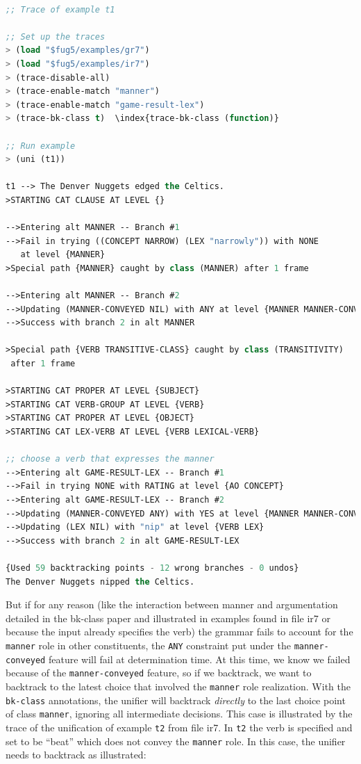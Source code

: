 \documentclass[10pt,a4paper]{report}
\begin{document}
\begin{lstlisting}[language=Lisp]

;; Trace of example t1

;; Set up the traces
> (load "$fug5/examples/gr7")
> (load "$fug5/examples/ir7")
> (trace-disable-all)
> (trace-enable-match "manner")
> (trace-enable-match "game-result-lex")
> (trace-bk-class t)  \index{trace-bk-class (function)}

;; Run example
> (uni (t1))

t1 --> The Denver Nuggets edged the Celtics.
>STARTING CAT CLAUSE AT LEVEL {}

-->Entering alt MANNER -- Branch #1
-->Fail in trying ((CONCEPT NARROW) (LEX "narrowly")) with NONE 
   at level {MANNER}
>Special path {MANNER} caught by class (MANNER) after 1 frame

-->Entering alt MANNER -- Branch #2
-->Updating (MANNER-CONVEYED NIL) with ANY at level {MANNER MANNER-CONVEYED}
-->Success with branch 2 in alt MANNER

>Special path {VERB TRANSITIVE-CLASS} caught by class (TRANSITIVITY) 
 after 1 frame

>STARTING CAT PROPER AT LEVEL {SUBJECT}
>STARTING CAT VERB-GROUP AT LEVEL {VERB}
>STARTING CAT PROPER AT LEVEL {OBJECT}
>STARTING CAT LEX-VERB AT LEVEL {VERB LEXICAL-VERB}

;; choose a verb that expresses the manner
-->Entering alt GAME-RESULT-LEX -- Branch #1
-->Fail in trying NONE with RATING at level {AO CONCEPT}
-->Entering alt GAME-RESULT-LEX -- Branch #2
-->Updating (MANNER-CONVEYED ANY) with YES at level {MANNER MANNER-CONVEYED}
-->Updating (LEX NIL) with "nip" at level {VERB LEX}
-->Success with branch 2 in alt GAME-RESULT-LEX

{Used 59 backtracking points - 12 wrong branches - 0 undos}
The Denver Nuggets nipped the Celtics.

\end{lstlisting}

But if for any reason (like the interaction between manner and
argumentation detailed in the bk-class paper and illustrated in examples found
in file ir7 or because the input already specifies the verb) the grammar
fails to account for the {\tt manner} role in other constituents, the {\tt ANY}
constraint put under the {\tt manner-conveyed} feature will fail at
determination time.  
At this time, we know we failed because of the
{\tt manner-conveyed} feature, so if we backtrack, we want to backtrack to
the latest choice that involved the {\tt manner} role realization.  With the
{\tt bk-class} annotations, the unifier will backtrack
{\em directly} to the last choice point of class {\tt manner}, ignoring all
intermediate decisions.  This case is illustrated by the trace of the
unification of  example {\tt t2} from file ir7.   In
{\tt t2} the verb is specified and set to be ``beat'' which does not convey
the {\tt manner} role.  In this case, the unifier needs to backtrack as
illustrated:
\end{document}
